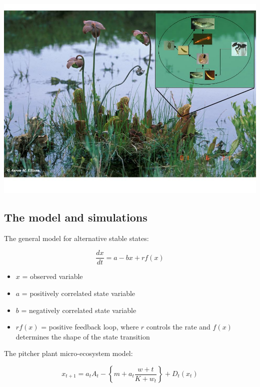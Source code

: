 \documentclass[a0,landscape]{a0poster}
\begin{document}
\begin{multicols}{4}
\begin{center}\vspace{1cm}
\includegraphics[width=0.95\linewidth]{spfoodweb}
\end{center}\vspace{1cm}

\subsection*{The model and simulations}

The general model for alternative stable states:

\begin{equation}
\frac{dx}{dt} = a - bx + r f(x)
\label{eqn:carpenter}
\end{equation}


\begin{itemize}
\item $x$ = observed variable
\item $a$ = positively correlated state variable
\item $b$ = negatively correlated state variable
\item $rf(x)$ = positive feedback loop, where $r$ controls the rate
  and $f(x)$ determines the shape of the state transition
\end{itemize}

The pitcher plant micro-ecosystem model:

\begin{equation}
x_{t+1} = a_t A_t - \left\{m + a_t \frac{w+t}{K + w_t}\right\} +
D_t(x_t)
\label{eqn:ppme}
\end{equation}




\end{multicols}
\end{document}
